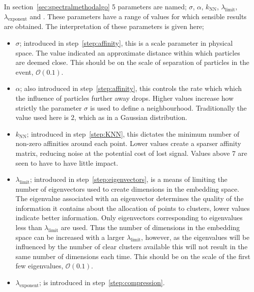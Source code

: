In section~\ref{sec:spectralmethodalgo} 5 parameters are named;
\(\sigma\), \(\alpha\), \(k_\text{NN}\), \(\lambda_\text{limit}\), \(\lambda_\text{exponent}\) and \stoppingdeltar{}.
These parameters have a range of values for which sensible results are obtained.
The interpretation of these parameters is given here;
\begin{itemize}
    \item \(\sigma\); introduced in step~\ref{step:affinity}, this is a scale parameter in physical space.
                      The value indicated an approximate distance within which particles are deemed close.
                      This should be on the scale of separation of particles in the event, \(\mathcal{O} (0.1)\).
    \item  \(\alpha\); also introduced in step~\ref{step:affinity}, this controls the rate which which 
           the influence of particles further away drops. 
           Higher values increase how strictly the parameter \(\sigma\) is used to define a neighbourhood.
           Traditionally the value used here is \(2\), which as in a Gaussian distribution.
       \item \(k_\text{NN}\); introduced in step~\ref{step:KNN}, this dictates the minimum number of non-zero affinities around each point.
           Lower values create a sparser affinity matrix, reducing noise at the potential cost of lost signal.
           Values above \(7\) are seen to have to have little impact.
       \item  \(\lambda_\text{limit}\); introduced in step~\ref{step:eigenvectors}, is a means of limiting the number of eigenvectors used
           to create dimensions in the embedding space.
           The eigenvalue associated with an eigenvector determines the quality of the information it contains about the allocation of points to clusters,
           lower values indicate better information.
           Only eigenvectors corresponding to eigenvalues less than \(\lambda_\text{limit}\) are used.
           Thus the number of dimensions in the embedding space can be increased with a larger \(\lambda_\text{limit}\),
           however, as the eigenvalues will be influenced by the number of clear clusters available 
           this will not result in the same number of dimensions each time.
           This should be on the scale of the first few eigenvalues, \(\mathcal{O} (0.1)\).
       \item  \(\lambda_\text{exponent}\); is introduced in step~\ref{step:compression}.

\end{itemize}
